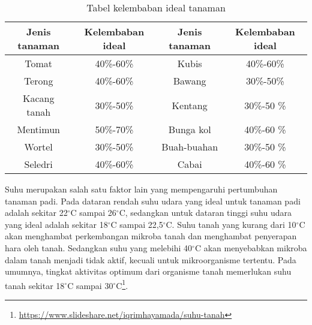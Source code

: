 \begin{table}[H] 
	\centering 
	\caption{Tabel kelembaban ideal tanaman}
	\label{tab:Tabel kelembaban ideal tanaman}
	\begin{tabular}{cccc}
		\toprule
		 Jenis tanaman & Kelembaban ideal & Jenis tanaman & Kelembaban ideal  \\

		\midrule
		Tomat & 40\%-60\%  & Kubis & 40\%-60\% \\
        Terong & 40\%-60\% & Bawang & 30\%-50\% \\
        Kacang tanah & 30\%-50\% & Kentang & 30\%-50 \% \\
        Mentimun & 50\%-70\% & Bunga kol & 40\%-60 \% \\
        Wortel & 30\%-50\% & Buah-buahan & 30\%-50 \% \\
        Seledri & 40\%-60\% & Cabai & 40\%-60 \% \\

		\bottomrule
		
	\end{tabular} 
\end{table}

Suhu merupakan salah satu faktor lain yang mempengaruhi pertumbuhan tanaman padi. Pada dataran rendah suhu udara yang ideal untuk tanaman padi adalah sekitar 22$^{\circ}$C sampai 26$^{\circ}$C, sedangkan untuk dataran tinggi suhu udara yang ideal adalah sekitar 18$^{\circ}$C sampai 22,5$^{\circ}$C. Suhu tanah yang kurang dari 10$^{\circ}$C akan menghambat perkembangan mikroba tanah dan menghambat penyerapan hara oleh tanah. Sedangkan suhu yang melebihi 40$^{\circ}$C akan menyebabkan mikroba dalam tanah menjadi tidak aktif, kecuali untuk mikroorganisme tertentu. Pada umumnya, tingkat aktivitas optimum dari organisme tanah memerlukan suhu tanah sekitar 18$^{\circ}$C sampai 30$^{\circ}$C\footnote{\url{https://www.slideshare.net/iqrimhayamada/suhu-tanah}}.


